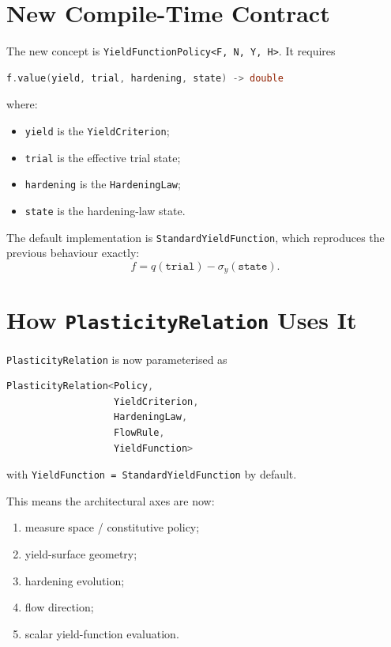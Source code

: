 \section{New Compile-Time Contract}

The new concept is
\texttt{YieldFunctionPolicy<F, N, Y, H>}.  It requires

\begin{lstlisting}[language=C++]
f.value(yield, trial, hardening, state) -> double
\end{lstlisting}

where:

\begin{itemize}
  \item \texttt{yield} is the \texttt{YieldCriterion};
  \item \texttt{trial} is the effective trial state;
  \item \texttt{hardening} is the \texttt{HardeningLaw};
  \item \texttt{state} is the hardening-law state.
\end{itemize}

The default implementation is \texttt{StandardYieldFunction}, which reproduces
the previous behaviour exactly:
\[
f = q(\texttt{trial}) - \sigma_y(\texttt{state}).
\]

\section{How \texttt{PlasticityRelation} Uses It}

\texttt{PlasticityRelation} is now parameterised as

\begin{lstlisting}[language=C++]
PlasticityRelation<Policy,
                   YieldCriterion,
                   HardeningLaw,
                   FlowRule,
                   YieldFunction>
\end{lstlisting}

with \texttt{YieldFunction = StandardYieldFunction} by default.

This means the architectural axes are now:

\begin{enumerate}
  \item measure space / constitutive policy;
  \item yield-surface geometry;
  \item hardening evolution;
  \item flow direction;
  \item scalar yield-function evaluation.
\end{enumerate}

